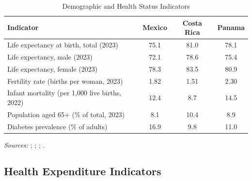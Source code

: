 \documentclass[12pt,a4paper]{article}
\begin{document}
\begin{appendices}
\begin{table}[H]
\centering
\caption{Demographic and Health Status Indicators}
\label{tab:demog}
\begin{tabular}{lccc}
\hline\hline
\textbf{Indicator} & \textbf{Mexico} & \textbf{Costa Rica} & \textbf{Panama} \\
\hline
Life expectancy at birth, total (2023)           & 75.1 & 81.0 & 78.1 \\
Life expectancy, male (2023)                     & 72.1 & 78.6 & 75.4 \\
Life expectancy, female (2023)                   & 78.3 & 83.5 & 80.9 \\
Fertility rate (births per woman, 2023)          & 1.82 & 1.51 & 2.30 \\
Infant mortality (per 1{,}000 live births, 2022) & 12.4 & 8.7  & 14.5 \\
Population aged 65+ (\% of total, 2023)          & 8.1  & 10.4 & 8.9  \\
Diabetes prevalence (\% of adults)               & 16.9 & 9.8  & 11.0 \\
\hline\hline
\end{tabular}
\begin{minipage}{\linewidth}
\smallskip
\footnotesize
\textit{Sources:} \citet{PAHOHIA2024}; \citet{WHOGHO2024};
\citet{WorldBankWDI2024}; \citet{OECDHaG2023}.
\end{minipage}
\end{table}

\subsection{Health Expenditure Indicators}
\label{app:health_table}


\end{appendices}
\end{document}
